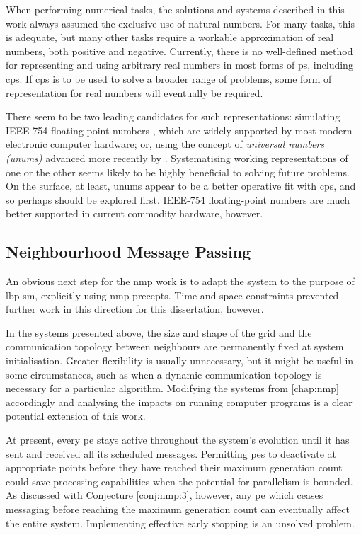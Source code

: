 When performing numerical tasks, the solutions and systems described in this work always assumed the exclusive use of natural numbers.  For many tasks, this is adequate, but many other tasks require a workable approximation of real numbers, both positive and negative.  Currently, there is no well-defined method for representing and using arbitrary real numbers in most forms of \gls{ps}, including \gls{cps}.  If \gls{cps} is to be used to solve a broader range of problems, some form of representation for real numbers will eventually be required.

There seem to be two leading candidates for such representations:  simulating IEEE-754 floating-point numbers \cite{ieee754}, which are widely supported by most modern electronic computer hardware;  or, using the concept of \emph{universal numbers (unums)} advanced more recently by \citeauthor{Gustafson2017} \cite{Gustafson2017}.  Systematising working representations of one or the other seems likely to be highly beneficial to solving future problems.  On the surface, at least, unums appear to be a better operative fit with \gls{cps}, and so perhaps should be explored first.  IEEE-754 floating-point numbers are much better supported in current commodity hardware, however.


\subsection{Neighbourhood Message Passing}
An obvious next step for the \gls{nmp} work is to adapt the system to the purpose of \gls{lbp} \gls{sm}, explicitly using \gls{nmp} precepts.  Time and space constraints prevented further work in this direction for this dissertation, however.

In the systems presented above, the size and shape of the grid and the communication topology between neighbours are permanently fixed at system initialisation.  Greater flexibility is usually unnecessary, but it might be useful in some circumstances, such as when a dynamic communication topology is necessary for a particular algorithm.  Modifying the systems from \cref{chap:nmp} accordingly and analysing the impacts on running computer programs is a clear potential extension of this work.

At present, every \gls{pe} stays active throughout the system's evolution until it has sent and received all its scheduled messages.  Permitting \glspl{pe} to deactivate at appropriate points before they have reached their maximum generation count could save processing capabilities when the potential for parallelism is bounded.  As discussed with Conjecture \ref{conj:nmp:3}, however, any \gls{pe} which ceases messaging before reaching the maximum generation count can eventually affect the entire system.  Implementing effective early stopping is an unsolved problem.

